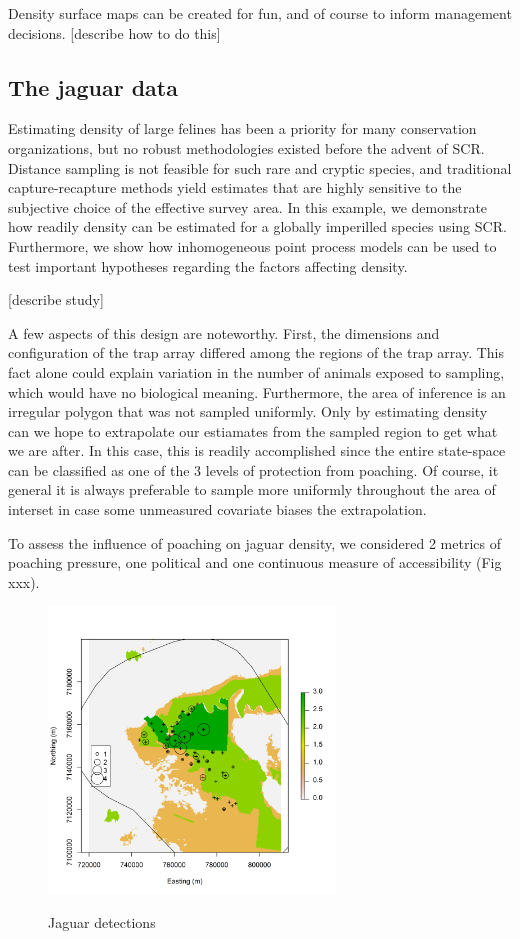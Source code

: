Density surface maps can be created for fun, and of course to inform
management decisions. [describe how to do this]


\subsection{The jaguar data}

Estimating density of large felines has been a priority for many
conservation organizations, but no robust methodologies existed before
the advent of SCR. Distance sampling is not feasible for such rare and
cryptic species, and traditional capture-recapture methods yield
estimates that are highly sensitive to the subjective choice of the
effective survey area. In this example, we
demonstrate how readily density can be estimated for a
globally imperilled species using SCR. Furthermore, we show how
inhomogeneous point process models can be used to test important
hypotheses regarding the factors affecting density.

[describe study]

A few aspects of this design are noteworthy. First, the dimensions and
configuration of the trap array differed among the regions of the trap
array. This fact alone could explain variation in the number of
animals exposed to sampling, which would have no biological
meaning. Furthermore, the area of inference is an irregular polygon
that was not sampled uniformly. Only by estimating density can we hope
to extrapolate our estiamates from the sampled region to get what we
are after. In this case, this is readily accomplished since the entire
state-space can be classified as one of the 3 levels of protection
from poaching. Of course, it general it is always preferable to sample
more uniformly throughout the area of interset in case some unmeasured
covariate biases the extrapolation.

To assess the influence of poaching on jaguar density, we considered 2
metrics of poaching pressure, one political and one continuous measure
of accessibility (Fig xxx).









\begin{figure}
\centering
\includegraphics[width=3in,height=3in]{Ch11/figs/jaguarCountMap}
\label{ch9:fig:jaguarCts}
\caption{Jaguar detections}
\end{figure}





